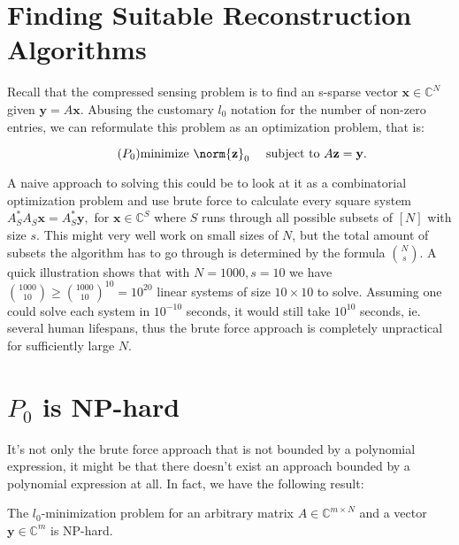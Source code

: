 \section{Finding Suitable Reconstruction Algorithms}

Recall that the compressed sensing problem is to find an s-sparse vector $\mathbf{x} \in \mathbb{C}^N$ given $\mathbf{y} = A\mathbf{x}$. Abusing the customary  $l_{0}$ notation for the number of non-zero entries, we can reformulate this problem as an optimization problem, that is: 


\begin{equation}
\tag{$P_0$}
\text{minimize} \  \norm{ \mathbf{z}}_{0} \ \ \ \ \text{subject to}   \ A \mathbf{z}=\mathbf{y}.
\end{equation}

A naive approach to solving this could be to look at it as a combinatorial optimization problem and use brute force to calculate every square system $A_{S}^{*}A_S\mathbf{x} =A_{S}^{*}\mathbf{y},$  for $\mathbf{x} \in \mathbb{C}^S$ where $S$ runs through all possible subsets of $[N]$ with size $s$. This might very well work on small sizes of $N$, but the total amount of subsets the algorithm has to go through is determined by the formula $\binom{N}{s}$. A quick illustration shows that with $N = 1000, s = 10$ we have $\binom{1000}{10} \geq \binom{1000}{10}^{10} = 10^{20}$ linear systems of size $10 \times 10$ to solve. Assuming one could solve each system in $10^{-10}$ seconds, it would still take $10^10$ seconds, ie. several human lifespans, thus the brute force approach is completely unpractical for sufficiently large $N$. 

\section*{$P_0$ is NP-hard}

It's not only the brute force approach that is not bounded by a polynomial expression, it might be that there doesn't exist an approach bounded by a polynomial expression at all. In fact, we have the following result: 



\begin{tcolorbox}[colback=yellow,colframe=white]
\begin{theorem}
The $l_{0}$-minimization problem for an arbitrary matrix $A \in \mathbb{C}^{m \times N}$ and a vector $\mathbf{y} \in \mathbb{C}^{m}$ is NP-hard.

\end{theorem}
\end{tcolorbox}

